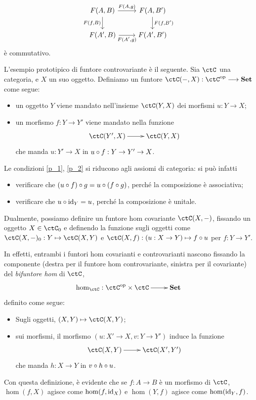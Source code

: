 \[
	\begin{tikzcd}
		F(A,B) \ar[r, "{F(A,g)}"]\ar[d, "{F(f,B)}"'] & F(A,B') \ar[d, "{F(f,B')}"]\\
		F(A',B) \ar[r, "{F(A',g)}"'] & F(A',B')
	\end{tikzcd}
\]
è commutativo.
\begin{example}\label{ex_hom_funtore}
	L'esempio prototipico di funtore controvariante è il seguente. Sia \(\ctC\) una categoria, e \(X\) un suo oggetto. Definiamo un funtore \(\ctC(-,X) : \ctC^\op\fun\ctSet\) come segue:
	\begin{itemize}
		\item un oggetto \(Y\) viene mandato nell'insieme \(\ctC(Y,X)\) dei morfismi \(u : Y\to X\);
		\item un morfismo \(f : Y\to Y'\) viene mandato nella funzione
		      \[\xymatrix{
				      \ctC(Y',X) \ar[r] & \ctC(Y,X)
			      }\]
		      che manda \(u : Y'\to X\) in \(u\circ f : Y\to Y' \to X\).
	\end{itemize}
	Le condizioni \ref{p_1}, \ref{p_2} si riducono agli assiomi di categoria: si può infatti
	\begin{itemize}
		\item verificare che \((u\circ f)\circ g = u\circ (f\circ g)\), perché la composizione è associativa;
		\item verificare che \(u\circ \mathrm{id}_Y = u\), perché la composizione è unitale.
	\end{itemize}
	Dualmente, possiamo definire un funtore hom covariante \(\ctC(X,-)\), fissando un oggetto \(X\in\ctC_0\) e definendo la funzione sugli oggetti come \(\ctC(X,-)_0 : Y\mapsto \ctC(X,Y)\) e \(\ctC(X,f) : (u : X\to Y)\mapsto f\cmp u\) per \(f : Y\to Y'\).

	 In effetti, entrambi i funtori hom covarianti e controvarianti nascono fissando la componente (destra per il funtore hom controvariante, sinistra per il covariante) del \emph{bifuntore hom} di \(\ctC\),
	\[\xymatrix{\hom_\ctC : \ctC^\op\times\ctC \ar[r] & \ctSet}\]
	definito come segue:
	\begin{itemize}
		\item Sugli oggetti, \((X,Y)\mapsto \ctC(X,Y)\);
		\item sui morfismi, il morfismo \((u : X'\to X, v : Y\to Y')\) induce la funzione
		      \[\xymatrix{\ctC(X,Y) \ar[r] & \ctC(X',Y')}\]
		      che manda \(h : X\to Y\) in \(v\circ h\circ u\).
	\end{itemize}
	Con questa definizione, è evidente che se \(f : A\to B\) è un morfismo di \(\ctC\), \(\hom(f,X)\) agisce come \(\hom(f,\mathrm{id}_X)\) e \(\hom(Y,f)\) agisce come \(\hom(\mathrm{id}_Y,f)\).
\end{example}

